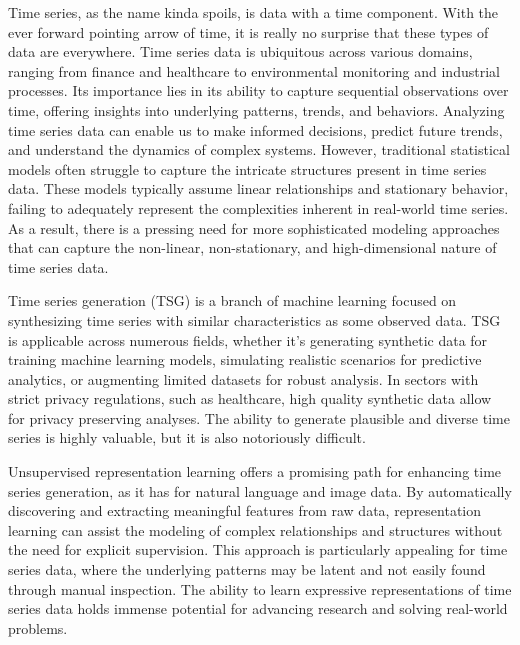 \documentclass[../../thesis.tex]{subfiles}
\begin{document}
Time series, as the name kinda spoils, is data with a time component. With the ever forward pointing arrow of time, it is really no surprise that these types of data are everywhere. Time series data is ubiquitous across various domains, ranging from finance and healthcare to environmental monitoring and industrial processes. Its importance lies in its ability to capture sequential observations over time, offering insights into underlying patterns, trends, and behaviors. Analyzing time series data can enable us to make informed decisions, predict future trends, and understand the dynamics of complex systems. However, traditional statistical models often struggle to capture the intricate structures present in time series data. These models typically assume linear relationships and stationary behavior, failing to adequately represent the complexities inherent in real-world time series. As a result, there is a pressing need for more sophisticated modeling approaches that can capture the non-linear, non-stationary, and high-dimensional nature of time series data.\newline

Time series generation (TSG) is a branch of machine learning focused on synthesizing time series with similar characteristics as some observed data. TSG is applicable across numerous fields, whether it's generating synthetic data for training machine learning models, simulating realistic scenarios for predictive analytics, or augmenting limited datasets for robust analysis. In sectors with strict privacy regulations, such as healthcare, high quality synthetic data allow for privacy preserving analyses. The ability to generate plausible and diverse time series is highly valuable, but it is also notoriously difficult.\newline

Unsupervised representation learning offers a promising path for enhancing time series generation, as it has for natural language and image data. By automatically discovering and extracting meaningful features from raw data, representation learning can assist the modeling of complex relationships and structures without the need for explicit supervision. This approach is particularly appealing for time series data, where the underlying patterns may be latent and not easily found through manual inspection. The ability to learn expressive representations of time series data holds immense potential for advancing research and solving real-world problems.\newline
\end{document}
